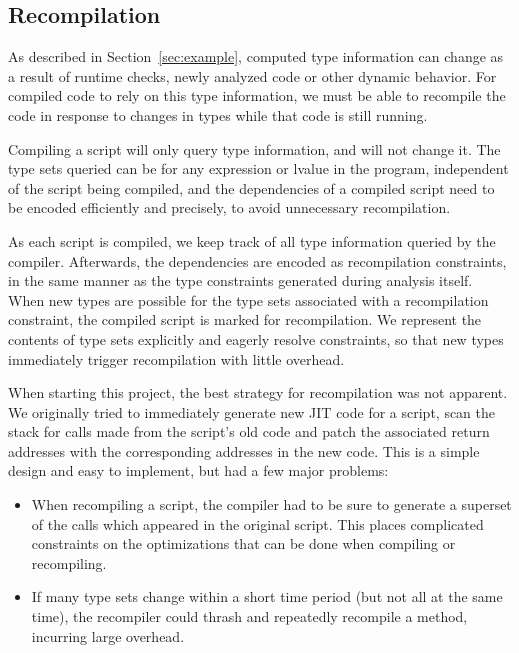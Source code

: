 \subsection{Recompilation}
\label{sec:recompilation}

As described in Section~\ref{sec:example}, computed type information can change as
a result of runtime checks, newly analyzed code or other dynamic behavior.
For compiled code to rely on this type information, we must be able
to recompile the code in response to changes in types while that code is
still running.

Compiling a script will only query type information, and will not change it.
The type sets queried can be for any expression or lvalue in the program,
independent of the script being compiled,
and the dependencies of a compiled script need to be encoded efficiently
and precisely, to avoid unnecessary recompilation.

As each script is compiled, we keep track of all type information queried
by the compiler.
Afterwards, the dependencies are encoded as recompilation constraints,
in the same manner as the type constraints generated during analysis itself.
When new types are possible for the type sets associated with a recompilation
constraint, the compiled script is marked for recompilation.
We represent the contents of type sets explicitly and eagerly resolve
constraints, so that new types immediately
trigger recompilation with little overhead.

When starting this project, the best strategy for recompilation
was not apparent.
We originally tried to immediately generate new JIT code for a script,
scan the stack for calls made from the script's old code and patch the
associated return addresses with the corresponding addresses in the
new code.
This is a simple design and easy to implement, but had a few major problems:

\begin{itemize}

\item When recompiling a script, the compiler had to be sure to generate
a superset of the calls which appeared in the original script.
This places complicated constraints on the optimizations that
can be done when compiling or recompiling.

\item If many type sets change within a short time period (but not all at
the same time), the recompiler could thrash and repeatedly recompile a
method, incurring large overhead.

\end{itemize}

